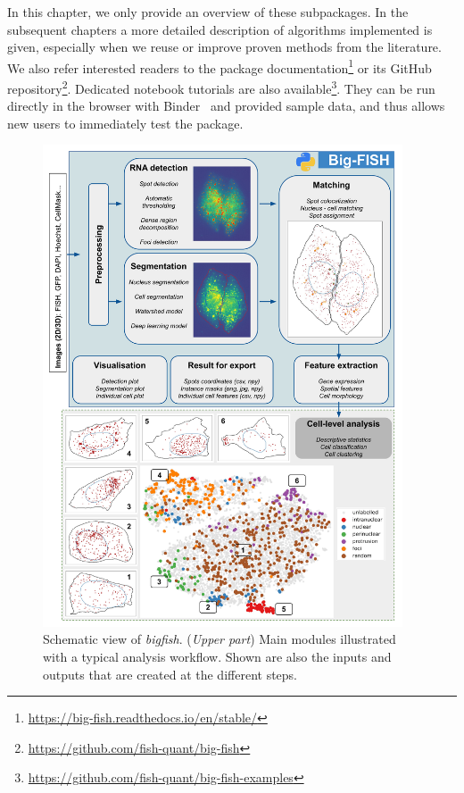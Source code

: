 In this chapter, we only provide an overview of these subpackages.
In the subsequent chapters a more detailed description of algorithms implemented is given, especially when we reuse or improve proven methods from the literature.
We also refer interested readers to the package documentation\footnote{\url{https://big-fish.readthedocs.io/en/stable/}} or its GitHub repository\footnote{\url{https://github.com/fish-quant/big-fish}}.
Dedicated notebook tutorials are also available\footnote{\url{https://github.com/fish-quant/big-fish-examples}}.
They can be run directly in the browser with Binder~\cite{Jupyter2018Binder2} and provided sample data, and thus allows new users to immediately test the package.

\begin{figure}[]
    \centering
    \includegraphics[width=0.95\textwidth]{figures/chapter1/schema_bigfish_full}
    \caption{Schematic view of \emph{bigfish}.
	(\textit{Upper part}) Main modules illustrated with a typical analysis workflow.
	Shown are also the inputs and outputs that are created at the different steps.
}
\end{figure}
